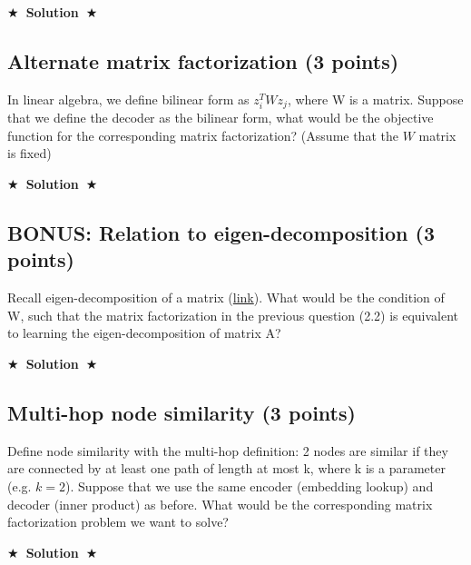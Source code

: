 \documentclass{article}
\numberwithin{figure}{section}
\newcommand{\Solution}[1]{%
    {%
        \medskip
        \color{red}
        \bf $\bigstar$~\sf\textbf{Solution}~$\bigstar$ \sf
        #1
    }
    \bigskip
}
\begin{document}
\Solution{}



\subsection{Alternate matrix factorization (3 points)}
In linear algebra, we define bilinear form as $z_i^T W z_j$, where W is a matrix. Suppose that we define the decoder as the bilinear form, what would be the objective function for the corresponding matrix factorization? (Assume that the $W$ matrix is fixed)

\Solution{}



\subsection{BONUS: Relation to eigen-decomposition (3 points)}
Recall eigen-decomposition of a matrix (\href{https://en.wikipedia.org/wiki/Eigendecomposition_of_a_matrix}{link}). What would be the condition of W, such that the matrix factorization in the previous question (2.2) is equivalent to learning the eigen-decomposition of matrix A?

\Solution{}

\subsection{Multi-hop node similarity (3 points)}
Define node similarity with the multi-hop definition: 2 nodes are similar if they are connected by at least one path of length at most k, where k is a parameter (e.g. $k = 2$). Suppose that we use the same encoder (embedding lookup) and decoder (inner product) as before. What would be the corresponding matrix factorization problem we want to solve?

\Solution{}
\end{document}
